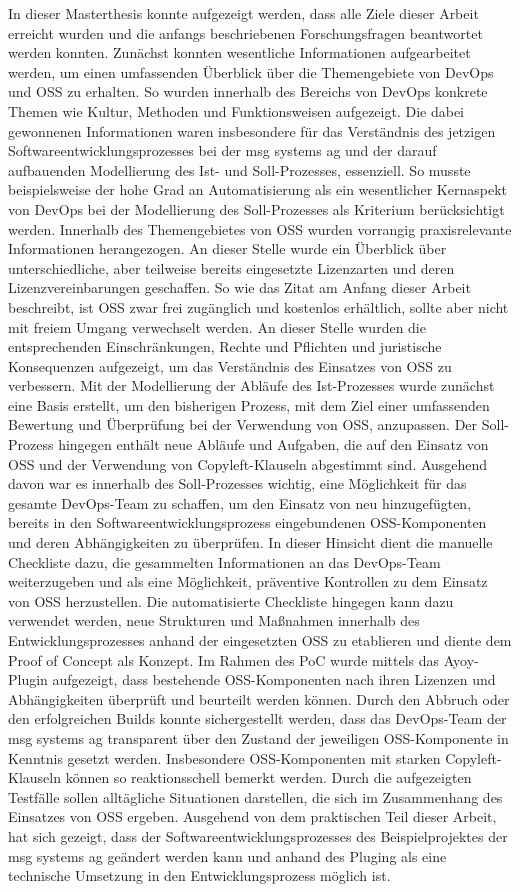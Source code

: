 In dieser Masterthesis konnte aufgezeigt werden, dass alle Ziele dieser Arbeit erreicht wurden und die anfangs beschriebenen Forschungsfragen beantwortet werden konnten. Zunächst konnten wesentliche Informationen aufgearbeitet werden, um einen umfassenden Überblick über die Themengebiete von DevOps und OSS zu erhalten. So wurden innerhalb des Bereichs von DevOps konkrete Themen wie Kultur, Methoden und Funktionsweisen aufgezeigt. Die dabei gewonnenen Informationen waren insbesondere für das Verständnis des jetzigen Softwareentwicklungsprozesses bei der msg systems ag und der darauf aufbauenden Modellierung des Ist- und Soll-Prozesses, essenziell. So musste beispielsweise der hohe Grad an Automatisierung als ein wesentlicher Kernaspekt von DevOps bei der Modellierung des Soll-Prozesses als Kriterium berücksichtigt werden. Innerhalb des Themengebietes von OSS wurden vorrangig praxisrelevante Informationen herangezogen. An dieser Stelle wurde ein Überblick über unterschiedliche, aber teilweise bereits eingesetzte Lizenzarten und deren Lizenzvereinbarungen geschaffen. So wie das Zitat am Anfang dieser Arbeit beschreibt, ist OSS zwar frei zugänglich und kostenlos erhältlich, sollte aber nicht mit freiem Umgang verwechselt werden. An dieser Stelle wurden die entsprechenden Einschränkungen, Rechte und Pflichten und juristische Konsequenzen aufgezeigt, um das Verständnis des Einsatzes von OSS zu verbessern. Mit der Modellierung der Abläufe des Ist-Prozesses wurde zunächst eine Basis erstellt, um den bisherigen Prozess, mit dem Ziel einer umfassenden Bewertung und Überprüfung bei der Verwendung von OSS, anzupassen. Der Soll-Prozess hingegen enthält neue Abläufe und Aufgaben, die auf den Einsatz von OSS und der Verwendung von Copyleft-Klauseln abgestimmt sind. Ausgehend davon war es innerhalb des Soll-Prozesses wichtig, eine Möglichkeit für das gesamte DevOps-Team zu schaffen, um den Einsatz von neu hinzugefügten, bereits in den Softwareentwicklungsprozess eingebundenen OSS-Komponenten und deren Abhängigkeiten zu überprüfen. In dieser Hinsicht dient die manuelle Checkliste dazu, die gesammelten Informationen an das DevOps-Team weiterzugeben und als eine Möglichkeit, präventive Kontrollen zu dem Einsatz von OSS herzustellen. Die automatisierte Checkliste hingegen kann dazu verwendet werden, neue Strukturen und Maßnahmen innerhalb des Entwicklungsprozesses anhand der eingesetzten OSS zu etablieren und diente dem Proof of Concept als Konzept. Im Rahmen des PoC wurde mittels das Ayoy-Plugin aufgezeigt, dass bestehende OSS-Komponenten nach ihren Lizenzen und Abhängigkeiten überprüft und beurteilt werden können. Durch den Abbruch oder den erfolgreichen Builds konnte sichergestellt werden, dass das DevOps-Team der msg systems ag transparent über den Zustand der jeweiligen OSS-Komponente in Kenntnis gesetzt werden. Insbesondere OSS-Komponenten mit starken Copyleft-Klauseln können so reaktionsschell bemerkt werden. Durch die aufgezeigten Testfälle sollen alltägliche Situationen darstellen, die sich im Zusammenhang des Einsatzes von OSS ergeben. Ausgehend von dem praktischen Teil dieser Arbeit, hat sich gezeigt, dass der Softwareentwicklungsprozesses des Beispielprojektes der msg systems ag geändert werden kann und anhand des Pluging als eine technische Umsetzung in den Entwicklungsprozess möglich ist. 

